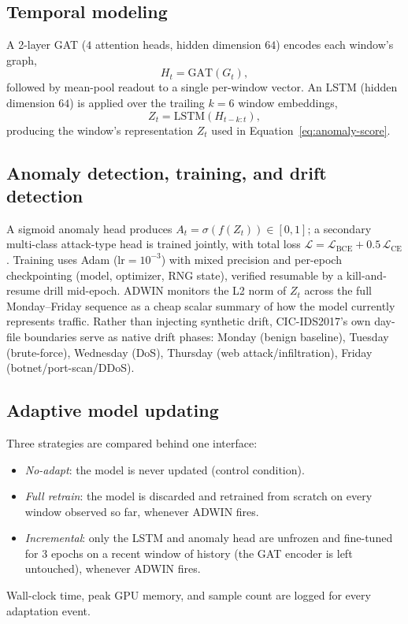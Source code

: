 \documentclass[twocolumn]{llncs}
\begin{document}
\subsection{Temporal modeling}
A 2-layer GAT ($4$ attention heads, hidden dimension $64$) encodes each window's graph,
\begin{equation}
H_t = \mathrm{GAT}(G_t),
\end{equation}
followed by mean-pool readout to a single per-window vector. An LSTM (hidden dimension $64$)
\cite{hochreiter1997lstm} is applied over the trailing $k=6$ window embeddings,
\begin{equation}
Z_t = \mathrm{LSTM}(H_{t-k:t}),
\end{equation}
producing the window's representation $Z_t$ used in Equation~\eqref{eq:anomaly-score}.

\subsection{Anomaly detection, training, and drift detection}
A sigmoid anomaly head produces $A_t = \sigma(f(Z_t)) \in [0,1]$; a secondary multi-class
attack-type head is trained jointly, with total loss $\mathcal{L} = \mathcal{L}_{\mathrm{BCE}} +
0.5\,\mathcal{L}_{\mathrm{CE}}$. Training uses Adam ($\mathrm{lr}=10^{-3}$) with mixed precision and
per-epoch checkpointing (model, optimizer, RNG state), verified resumable by a kill-and-resume
drill mid-epoch. ADWIN monitors the L2 norm of $Z_t$ across the full Monday--Friday sequence as a
cheap scalar summary of how the model currently represents traffic. Rather than injecting synthetic
drift, CIC-IDS2017's own day-file boundaries serve as native drift phases: Monday (benign
baseline), Tuesday (brute-force), Wednesday (DoS), Thursday (web attack/infiltration), Friday
(botnet/port-scan/DDoS).

\subsection{Adaptive model updating}
Three strategies are compared behind one interface:
\begin{itemize}[nosep]
  \item \emph{No-adapt}: the model is never updated (control condition).
  \item \emph{Full retrain}: the model is discarded and retrained from scratch on every window
        observed so far, whenever ADWIN fires.
  \item \emph{Incremental}: only the LSTM and anomaly head are unfrozen and fine-tuned for 3
        epochs on a recent window of history (the GAT encoder is left untouched), whenever ADWIN
        fires.
\end{itemize}
Wall-clock time, peak GPU memory, and sample count are logged for every adaptation event.
\end{document}
